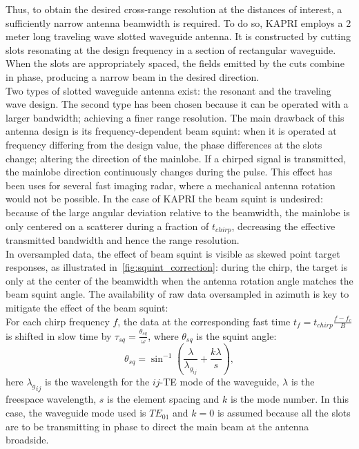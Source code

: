Thus, to obtain the desired cross-range resolution at the distances of interest, a sufficiently narrow antenna beamwidth is required. To do so, KAPRI employs a 2 meter long traveling wave slotted waveguide antenna\cite{Hines1953a,Granet2007}. It is constructed by cutting slots resonating at the design frequency in a section of rectangular waveguide. When the slots are appropriately spaced, the fields emitted by the cuts combine in phase, producing a narrow beam in the desired direction.\\ Two types of slotted waveguide antenna exist\cite{Enjiu2013}: the resonant and the traveling wave design. The second type has been chosen because it can be operated with a larger bandwidth; achieving a finer range resolution. The main drawback of this antenna design is its frequency-dependent beam squint: when it is operated at frequency differing from the design value, the phase differences at the slots change; altering the direction of the mainlobe. If a chirped signal is transmitted, the mainlobe direction continuously changes during the pulse. This effect has been uses for several fast imaging radar, where a mechanical antenna rotation would not be possible\cite{Yang2014,Yang2012,Mayer2003,Alvarez2013}. In the case of KAPRI the beam squint is undesired: because of the large angular deviation relative to the beamwidth, the mainlobe is only centered on a scatterer during a fraction of $t_{chirp}$, decreasing the effective transmitted bandwidth and hence the range resolution. \\ 
In oversampled data, the effect of beam squint is visible as skewed point target responses, as illustrated in~\autoref{fig:squint_correction}: during the chirp, the target is only at the center of the beamwidth when the antenna rotation angle matches the beam squint angle. 
The availability of raw data oversampled in azimuth is key to mitigate the effect of the beam squint:\\ For each chirp frequency $f$, the data at the corresponding fast time $t_{f} = t_{chirp}\frac{f - f_c}{B}$  is shifted in slow time by $\tau_{sq}=\frac{\theta_{sq}}{\omega}$, where $\theta_{sq}$ is the squint angle:
\begin{equation}\label{eq:squint_exact}
	\theta_{sq} = \sin^{-1}\left(\frac{\lambda}{\lambda_{g_{ij}}} + \frac{k \lambda}{s}\right),
\end{equation}
here ${\lambda_g}_{ij}$ is the wavelength for the $ij$-TE mode of the waveguide, $\lambda$ is the freespace wavelength, $s$ is the element spacing and $k$ is the mode number. In this case, the waveguide mode used is $TE_{01}$ and $k=0$ is assumed because all the slots are to be transmitting in phase\cite{kraus88} to direct the main beam at the antenna broadside.\\
